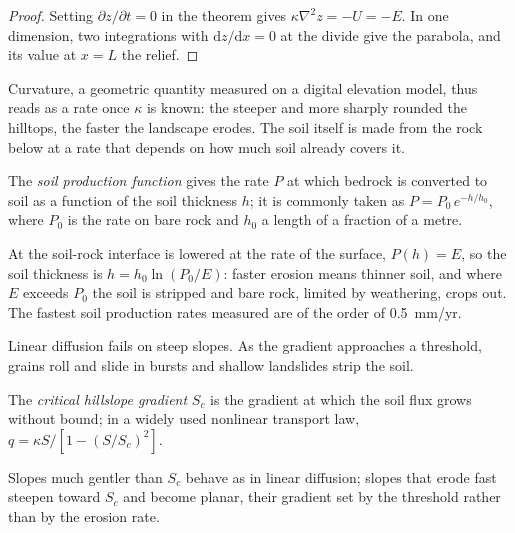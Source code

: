 \begin{proof}
Setting $\partial z/\partial t = 0$ in the theorem gives $\kappa\nabla^2 z =
-U = -E$. In one dimension, two integrations with $\mathrm{d}z/\mathrm{d}x =
0$ at the divide give the parabola, and its value at $x = L$ the relief.
\end{proof}

Curvature, a geometric quantity measured on a digital elevation model, thus
reads as a rate once $\kappa$ is known: the steeper and more sharply rounded
the hilltops, the faster the landscape erodes. The soil itself is made from
the rock below at a rate that depends on how much soil already covers it.

\begin{definition}\label{def:b3:quantitative-geomorphology:soil-production}
The \emph{soil production function} gives
the rate $P$ at which bedrock is converted to soil as a function of the
soil thickness $h$; it is commonly taken as $P = P_0\,e^{-h/h_0}$, where
$P_0$ is the rate on bare rock and $h_0$ a length of a fraction of a metre.
\end{definition}

At  the soil-rock interface is lowered at the rate of the
surface, $P(h) = E$, so the soil thickness is $h = h_0 \ln(P_0/E)$: faster
erosion means thinner soil, and where $E$ exceeds $P_0$ the soil is
stripped and bare rock, limited by weathering, crops out. The fastest soil
production rates measured are of the order of \qty{0.5}{mm/yr}.

Linear diffusion fails on steep slopes. As the gradient approaches a
threshold, grains roll and slide in bursts and shallow landslides strip the
soil.

\begin{definition}\label{def:b3:quantitative-geomorphology:critical}
The \emph{critical hillslope gradient}
$S_c$ is the gradient at which the soil flux grows without bound; in a
widely used nonlinear transport law, $q = \kappa S/[1 - (S/S_c)^2]$.
\end{definition}

Slopes much gentler than $S_c$ behave as in linear diffusion; slopes that
erode fast steepen toward $S_c$ and become planar, their gradient set by the
threshold rather than by the erosion rate.

